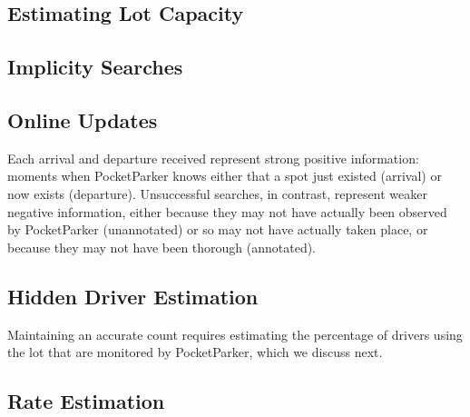 \subsection{Estimating Lot Capacity}

\subsection{Implicity Searches}
\label{subsec-synthetic}

\subsection{Online Updates}
\label{subsec-online}

Each arrival and departure received represent strong positive information:
moments when PocketParker knows either that a spot just existed (arrival) or
now exists (departure). Unsuccessful searches, in contrast, represent weaker
negative information, either because they may not have actually been observed
by PocketParker (unannotated) or so may not have actually taken place, or
because they may not have been thorough (annotated).

\subsection{Hidden Driver Estimation}
\label{subsec-hidden}

Maintaining an accurate count requires estimating the
percentage of drivers using the lot that are monitored by PocketParker, which
we discuss next.

\subsection{Rate Estimation}
\label{subsec-rates}
